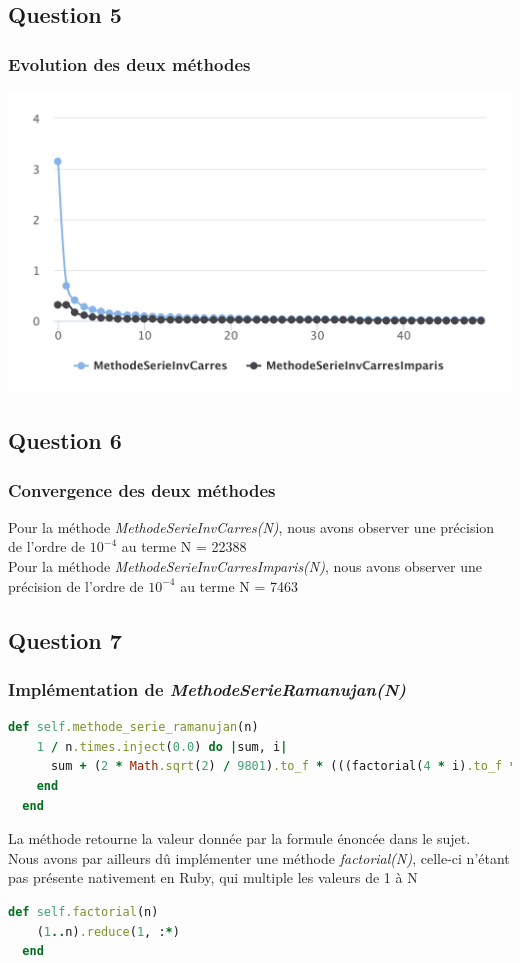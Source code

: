 \documentclass[a4paper,10pt]{report}
\begin{document}
\subsection{Question 5}
\subsubsection{Evolution des deux méthodes}
\includegraphics[scale=0.75]{images/question_5.png}
\bigskip

\subsection{Question 6}
\subsubsection{Convergence des deux méthodes}
Pour la méthode \textit{MethodeSerieInvCarres(N)}, nous avons observer une précision de l'ordre de $10^{-4}$ au terme N = 22388\\
Pour la méthode \textit{MethodeSerieInvCarresImparis(N)}, nous avons observer une précision de l'ordre de $10^{-4}$ au terme N = 7463
\bigskip

\clearpage
\subsection{Question 7}
\subsubsection{Implémentation de \textit{MethodeSerieRamanujan(N)}}
\begin{lstlisting}[language=Ruby]
  def self.methode_serie_ramanujan(n)
    1 / n.times.inject(0.0) do |sum, i|
      sum + (2 * Math.sqrt(2) / 9801).to_f * (((factorial(4 * i).to_f * (1103 + 26390 * i).to_f)).to_f / ((factorial(i).to_f ** 4) * (4 * 99) ** (4 * i).to_f).to_f)
    end
  end
\end{lstlisting}
La méthode retourne la valeur donnée par la formule énoncée dans le sujet.\\
Nous avons par ailleurs dû implémenter une méthode \textit{factorial(N)}, celle-ci n'étant pas présente nativement en Ruby, qui multiple les valeurs de 1 à N\\
\begin{lstlisting}[language=Ruby]
  def self.factorial(n)
    (1..n).reduce(1, :*)
  end
\end{lstlisting}
\end{document}
